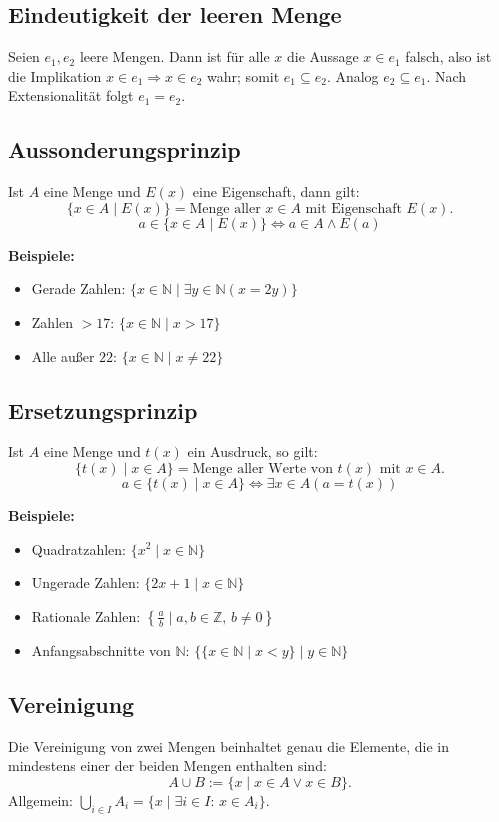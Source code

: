 \documentclass[10pt,landscape]{article}
\begin{document}
\begin{multicols*}{4}
\subsection{Eindeutigkeit der leeren Menge}
Seien \(e_1,e_2\) leere Mengen. Dann ist für alle \(x\) die Aussage \(x\in e_1\) falsch, also ist die Implikation \(x\in e_1\Rightarrow x\in e_2\) wahr; somit \(e_1\subseteq e_2\). Analog \(e_2\subseteq e_1\). Nach Extensionalität folgt \(e_1=e_2\).


\subsection{Aussonderungsprinzip}
Ist \(A\) eine Menge und \(E(x)\) eine Eigenschaft, dann gilt:
\[
\{x \in A \mid E(x)\} = \text{Menge aller } x \in A \text{ mit Eigenschaft } E(x).
\]
\[
a \in \{x \in A \mid E(x)\} \iff a \in A \wedge E(a)
\]

\textbf{Beispiele:}
\begin{itemize}
  \item Gerade Zahlen: \(\{x \in \mathbb{N} \mid \exists y \in \mathbb{N} (x = 2y)\}\)
  \item Zahlen \(> 17\): \(\{x \in \mathbb{N} \mid x > 17\}\)
  \item Alle außer \(22\): \(\{x \in \mathbb{N} \mid x \neq 22\}\)
\end{itemize}

\subsection{Ersetzungsprinzip}
Ist \(A\) eine Menge und \(t(x)\) ein Ausdruck, so gilt:
\[ \{t(x) \mid x \in A\} = \text{Menge aller Werte von } t(x) \text{ mit } x \in A. \]
\[ a \in \{t(x) \mid x \in A\} \iff \exists x \in A (a = t(x)) \]

\textbf{Beispiele:}
\begin{itemize}
  \item Quadratzahlen: \(\{x^2 \mid x \in \mathbb{N}\}\)
  \item Ungerade Zahlen: \(\{2x + 1 \mid x \in \mathbb{N}\}\)
  \item Rationale Zahlen: \(\left\{\frac{a}{b} \mid a,b \in \mathbb{Z},\, b \neq 0\right\}\)
  \item Anfangsabschnitte von \(\mathbb{N}\): \(\{\{x \in \mathbb{N} \mid x < y\} \mid y \in \mathbb{N}\}\)
\end{itemize}




\subsection{Vereinigung}
Die Vereinigung von zwei Mengen beinhaltet genau die Elemente, die in mindestens einer der beiden Mengen enthalten sind:
\[
A\cup B:=\{x\mid x\in A\vee x\in B\}.
\]
Allgemein: \(\displaystyle\bigcup_{i\in I} A_i=\{x\mid\exists i\in I:\,x\in A_i\}.\)


\end{multicols*}
\end{document}
